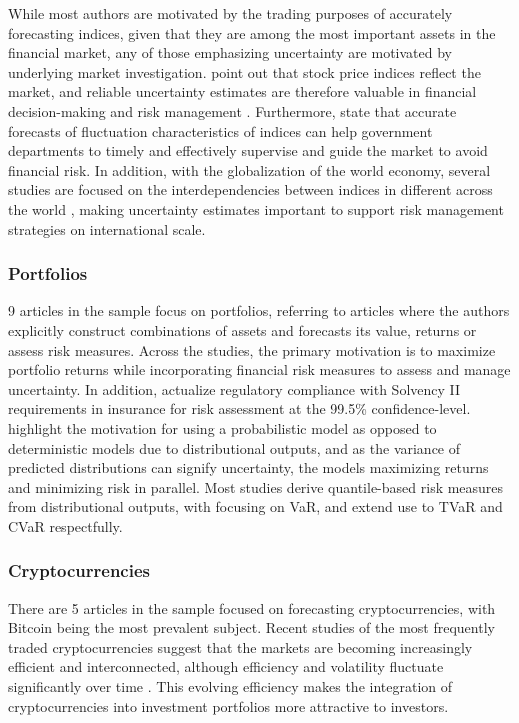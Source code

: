 While most authors are motivated by the trading purposes of accurately forecasting indices, given that they are among the most important assets in the financial market, any of those emphasizing uncertainty are motivated by underlying market investigation. \textcite{Suphawan2022gpr} point out that stock price indices reflect the market, and reliable uncertainty estimates are therefore valuable in financial decision-making and risk management \parencite{Wang2021gpr}. Furthermore, \textcite{Wang2021gprensemble} state that accurate forecasts of fluctuation characteristics of indices can help government departments to timely and effectively supervise and guide the market to avoid financial risk. In addition, with the globalization of the world economy, several studies are focused on the interdependencies between indices in different across the world \parencite{cao2019multi, Malagrino2018Forecasting}, making uncertainty estimates important to support risk management strategies on international scale.

\subsubsection{Portfolios}
9 articles in the sample focus on portfolios, referring to articles where the authors explicitly construct combinations of assets and forecasts its value, returns or assess risk measures. Across the studies, the primary motivation is to maximize portfolio returns while incorporating financial risk measures to assess and manage uncertainty. In addition, \textcite{Risk2018gpr} actualize regulatory compliance with Solvency II requirements in insurance for risk assessment at the 99.5\% confidence-level. \textcite{kim2023portfolio} highlight the motivation for using a probabilistic model as opposed to deterministic models due to distributional outputs, and as the variance of predicted distributions can signify uncertainty, the models maximizing returns and minimizing risk in parallel. Most studies derive quantile-based risk measures from distributional outputs, with \textcite{Fatouros2023DeepVaR, arian2022encoded, caprioli2023quantifying} focusing on VaR, and  \textcite{Risk2018gpr, Min2023BlackLitterman} extend use to TVaR and CVaR respectfully. 

\subsubsection{Cryptocurrencies}
There are 5 articles in the sample focused on forecasting cryptocurrencies, with Bitcoin being the most prevalent subject. Recent studies of the most frequently traded cryptocurrencies suggest that the markets are becoming increasingly efficient and interconnected, although efficiency and volatility fluctuate significantly over time \parencite{noda2021evolution, liu2019volatility, gupta2022empirical}. This evolving efficiency makes the integration of cryptocurrencies into investment portfolios more attractive to investors.

